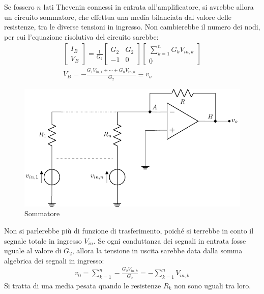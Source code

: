 \documentclass{article}
\numberwithin{equation}{subsection}
\begin{document}
Se fossero $n$ lati Thevenin connessi in entrata all'amplificatore, si avrebbe allora un circuito sommatore, che effettua una 
media bilanciata dal valore delle resistenze, tra le diverse tensioni in ingresso. Non cambierebbe il numero dei nodi, per cui l'equazione risolutiva 
del circuito sarebbe:
\begin{gather*}
    \begin{bmatrix}
        I_B\\V_B
    \end{bmatrix}=\displaystyle\frac{1}{G_2}\begin{bmatrix}
        G_2&G_2\\-1&0
    \end{bmatrix}\begin{bmatrix}
        \displaystyle\sum_{k=1}^nG_kV_{in,k}\\0
    \end{bmatrix}\\
    V_B=\displaystyle-\frac{G_1V_{in,1}+\cdots+G_nV_{in,n}}{G_2}\equiv v_o
\end{gather*}
\begin{figure}[H]%
    \centering
    \includegraphics{amplificatore-sommatore.pdf}%
    \caption{Sommatore}
    \label{fig:amplificatore-sommatore}
\end{figure}
Non si parlerebbe più di funzione di trasferimento, poiché si terrebbe in conto il segnale totale in ingresso $V_{in}$. 
Se ogni conduttanza dei segnali in entrata fosse uguale al valore di $G_2$, allora la tensione in uscita sarebbe data dalla somma algebrica dei 
segnali in ingresso:
\begin{gather*}
    v_0=\displaystyle\sum_{k=1}^n-\frac{G_2V_{in,k}}{G_2}=-\sum_{k=1}^nV_{in,k}
\end{gather*}
Si tratta di una media pesata quando le resistenze $R_k$ non sono uguali tra loro. 
\end{document}

